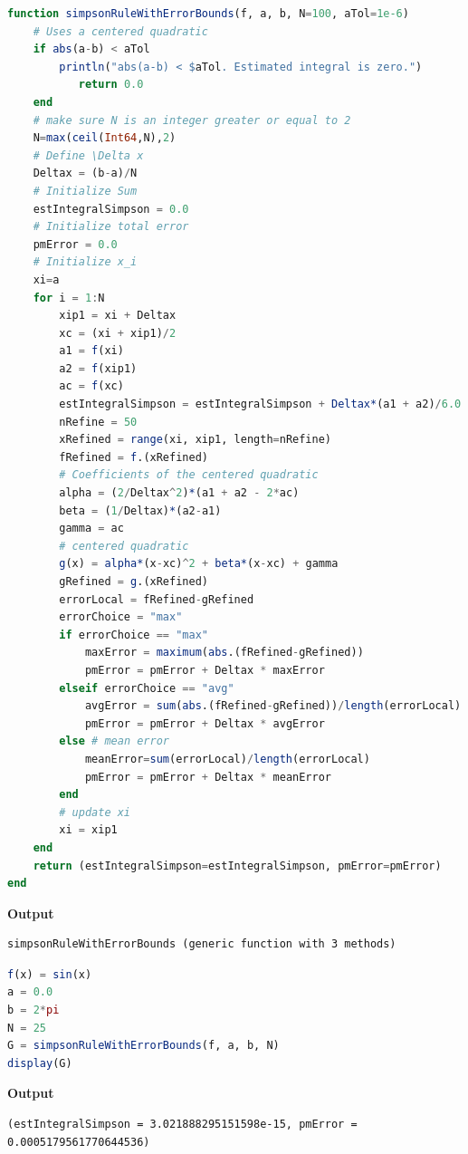 \begin{lstlisting}[language=Julia,style=mystyle]
function simpsonRuleWithErrorBounds(f, a, b, N=100, aTol=1e-6)
    # Uses a centered quadratic
    if abs(a-b) < aTol 
        println("abs(a-b) < $aTol. Estimated integral is zero.")
           return 0.0
    end
    # make sure N is an integer greater or equal to 2
    N=max(ceil(Int64,N),2)
    # Define \Delta x
    Deltax = (b-a)/N
    # Initialize Sum
    estIntegralSimpson = 0.0
    # Initialize total error
    pmError = 0.0
    # Initialize x_i
    xi=a
    for i = 1:N
        xip1 = xi + Deltax
        xc = (xi + xip1)/2 
        a1 = f(xi)
        a2 = f(xip1)
        ac = f(xc) 
        estIntegralSimpson = estIntegralSimpson + Deltax*(a1 + a2)/6.0 + 2.0*Deltax*ac/3.0
        nRefine = 50
        xRefined = range(xi, xip1, length=nRefine)
        fRefined = f.(xRefined)
        # Coefficients of the centered quadratic
        alpha = (2/Deltax^2)*(a1 + a2 - 2*ac)
        beta = (1/Deltax)*(a2-a1)
        gamma = ac
        # centered quadratic
        g(x) = alpha*(x-xc)^2 + beta*(x-xc) + gamma
        gRefined = g.(xRefined)
        errorLocal = fRefined-gRefined
        errorChoice = "max"
        if errorChoice == "max"
            maxError = maximum(abs.(fRefined-gRefined))
            pmError = pmError + Deltax * maxError
        elseif errorChoice == "avg"
            avgError = sum(abs.(fRefined-gRefined))/length(errorLocal)
            pmError = pmError + Deltax * avgError
        else # mean error
            meanError=sum(errorLocal)/length(errorLocal)
            pmError = pmError + Deltax * meanError
        end
        # update xi
        xi = xip1
    end
    return (estIntegralSimpson=estIntegralSimpson, pmError=pmError) 
end
\end{lstlisting}
\textbf{Output} 
\begin{verbatim}
simpsonRuleWithErrorBounds (generic function with 3 methods)
\end{verbatim}

\bigskip

\begin{lstlisting}[language=Julia,style=mystyle]
f(x) = sin(x)
a = 0.0
b = 2*pi
N = 25
G = simpsonRuleWithErrorBounds(f, a, b, N)
display(G)
\end{lstlisting}
\textbf{Output} 
\begin{verbatim}
(estIntegralSimpson = 3.021888295151598e-15, pmError = 0.0005179561770644536)
\end{verbatim}

\bigskip

